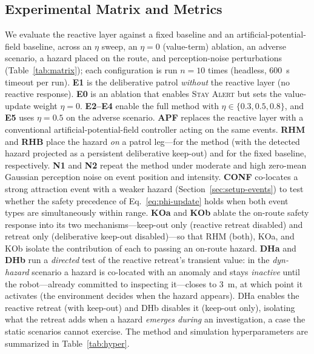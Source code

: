 \subsection{Experimental Matrix and Metrics}
\label{sec:setup-matrix}
We evaluate the reactive layer against a fixed baseline and an
artificial-potential-field baseline, across an $\eta$ sweep, an $\eta=0$ (value-term) ablation,
an adverse scenario, a hazard placed on the route, and perception-noise
perturbations (Table~\ref{tab:matrix}); each configuration is run $n=10$ times
(headless, $600$~s timeout per run). \textbf{E1} is the deliberative patrol
\emph{without} the reactive layer (no reactive response). \textbf{E0} is an
ablation that enables \textsc{Stay Alert} but sets the value-update weight
$\eta=0$. \textbf{E2--E4} enable the full method with
$\eta\in\{0.3,0.5,0.8\}$, and \textbf{E5} uses $\eta=0.5$ on the adverse
scenario. \textbf{APF} replaces the reactive layer with a conventional
artificial-potential-field controller acting on the same events. \textbf{RHM}
and \textbf{RHB} place the hazard \emph{on} a patrol leg---for the method (with
the detected hazard projected as a persistent deliberative keep-out) and for
the fixed baseline, respectively. \textbf{N1} and \textbf{N2} repeat the method
under moderate and high zero-mean Gaussian perception noise on event position and
intensity. \textbf{CONF} co-locates a strong attraction event with a weaker
hazard (Section~\ref{sec:setup-events}) to test whether the safety precedence of
Eq.~\eqref{eq:phi-update} holds when both event types are simultaneously within
range. \textbf{KOa} and \textbf{KOb} ablate the on-route safety response into its
two mechanisms---keep-out only (reactive retreat disabled) and retreat only
(deliberative keep-out disabled)---so that RHM (both), KOa, and KOb isolate the
contribution of each to passing an on-route hazard. \textbf{DHa} and \textbf{DHb}
run a \emph{directed} test of the reactive retreat's transient value: in the
\emph{dyn-hazard} scenario a hazard is co-located with an anomaly and stays
\emph{inactive} until the robot---already committed to inspecting it---closes to
$3$~m, at which point it activates (the environment decides when the hazard
appears). DHa enables the reactive retreat (with keep-out) and DHb disables it
(keep-out only), isolating what the retreat adds when a hazard \emph{emerges during}
an investigation, a case the static scenarios cannot exercise. The method and
simulation hyperparameters are summarized in Table~\ref{tab:hyper}.

